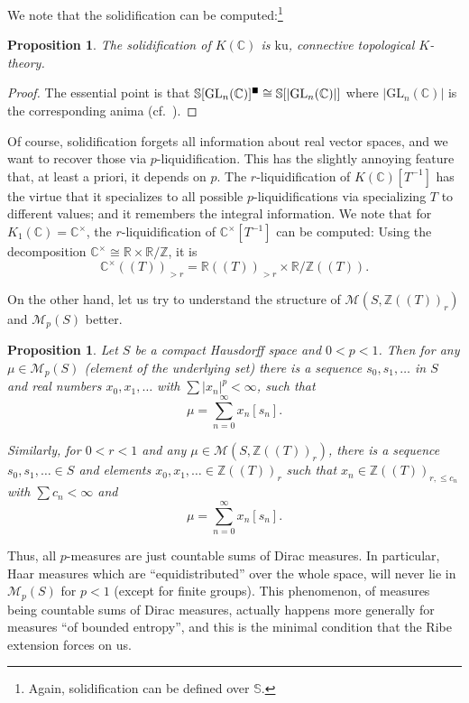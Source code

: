 \documentclass[11pt]{amsbook}
\newcommand{\solid}{{\mathsmaller{\blacksquare}}}
\numberwithin{equation}{section}
\numberwithin{theorem}{section}
\newtheorem{proposition}[theorem]{Proposition}
\theoremstyle{definition}
\begin{document}
We note that the solidification can be computed:\footnote{Again, solidification can be defined over $\mathbb S$.}

\begin{proposition} The solidification of $K(\mathbb C)$ is $\mathrm{ku}$, connective topological $K$-theory.
\end{proposition}

\begin{proof} The essential point is that $\mathbb S[\mathrm{GL}_n(\mathbb C)]^\solid\cong \mathbb S[|\mathrm{GL}_n(\mathbb C)|]$ where $|\mathrm{GL}_n(\mathbb C)|$ is the corresponding anima (cf.~\cite[Example 6.5]{Condensed}).
\end{proof}

Of course, solidification forgets all information about real vector spaces, and we want to recover those via $p$-liquidification. This has the slightly annoying feature that, at least a priori, it depends on $p$. The $r$-liquidification of $K(\mathbb C)[T^{-1}]$ has the virtue that it specializes to all possible $p$-liquidifications via specializing $T$ to different values; and it remembers the integral information. We note that for $K_1(\mathbb C)=\mathbb C^\times$, the $r$-liquidification of $\mathbb C^\times[T^{-1}]$ can be computed: Using the decomposition $\mathbb C^\times\cong \mathbb R\times \mathbb R/\mathbb Z$, it is
\[
\mathbb C^\times((T))_{>r} = \mathbb R((T))_{>r}\times \mathbb R/\mathbb Z((T)).
\]

On the other hand, let us try to understand the structure of $\mathcal M(S,\mathbb Z((T))_r)$ and $\mathcal M_p(S)$ better.

\begin{proposition} Let $S$ be a compact Hausdorff space and $0<p<1$. Then for any $\mu\in \mathcal M_{p}(S)$ (element of the underlying set) there is a sequence $s_0,s_1,\ldots$ in $S$ and real numbers $x_0,x_1,\ldots$ with $\sum |x_n|^{p}<\infty$, such that
\[
\mu=\sum_{n=0}^\infty x_n [s_n].
\]

Similarly, for $0<r<1$ and any $\mu\in \mathcal M(S,\mathbb Z((T))_r)$, there is a sequence $s_0,s_1,\ldots\in S$ and elements $x_0,x_1,\ldots\in \mathbb Z((T))_r$ such that $x_n\in \mathbb Z((T))_{r,\leq c_n}$ with $\sum c_n<\infty$ and
\[
\mu=\sum_{n=0}^\infty x_n [s_n].
\]
\end{proposition}

Thus, all $p$-measures are just countable sums of Dirac measures. In particular, Haar measures which are ``equidistributed'' over the whole space, will never lie in $\mathcal M_{p}(S)$ for $p<1$ (except for finite groups). This phenomenon, of measures being countable sums of Dirac measures, actually happens more generally for measures ``of bounded entropy'', and this is the minimal condition that the Ribe extension forces on us.
\end{document}
